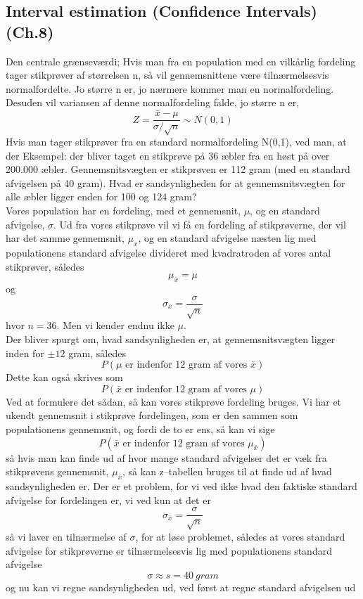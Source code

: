 \documentclass[11pt]{article}
\begin{document}
\subsection{Interval estimation (Confidence Intervals) (Ch.8)}
Den centrale grænseværdi; Hvis man fra en population med en vilkårlig fordeling tager stikprøver af størrelsen n, så vil gennemsnittene være tilnærmelsesvis normalfordelte. Jo større n er, jo nærmere kommer man en normalfordeling. Desuden vil variansen af denne normalfordeling falde, jo større n er,
$$Z=\frac{\bar{x}-\mu }{\sigma/\sqrt{n}}\sim N(0,1)$$
Hvis man tager stikprøver fra en standard normalfordeling N(0,1), ved man, at der
Eksempel: der bliver taget en stikprøve på 36 æbler fra en høst på over 200.000 æbler. Gennemsnitsvægten er stikprøven er 112 gram (med en standard afvigelsen på 40 gram). Hvad er sandsynligheden for at gennemsnitsvægten for alle æbler ligger enden for 100 og 124 gram?\\[0.2cm]
Vores population har en fordeling, med et gennemsnit, $\mu$, og en standard afvigelse, $\sigma$. Ud fra vores stikprøve vil vi få en fordeling af stikprøverne, der vil har det samme gennemsnit, $\mu_x$, og en standard afvigelse næsten lig med populationens standard afvigelse divideret med kvadratroden af vores antal stikprøver, således
$$\mu_{\bar{x}}=\mu$$
og 
$$\sigma_{\bar{x}}= \frac{\sigma}{\sqrt{n}}$$
hvor $n=36$. Men vi kender endnu ikke $\mu$.\\[0.2cm]
Der bliver spurgt om, hvad sandsynligheden er, at gennemsnitsvægten ligger inden for $\pm 12$ gram, således
$$P(\mu\text{ er indenfor 12 gram af vores }\bar{x})$$
Dette kan også skrives som
$$P(\bar{x}\text{ er indenfor 12 gram af vores }\mu)$$
Ved at formulere det sådan, så kan vores stikprøve fordeling bruges. Vi har et ukendt gennemsnit i stikprøve fordelingen, som er den sammen som populationens gennemsnit, og fordi de to er ens, så kan vi sige
$$P(\bar{x}\text{ er indenfor 12 gram af vores }\mu_{\bar{x}})$$
så hvis man kan finde ud af hvor mange standard afvigelser det er væk fra stikprøvens gennemsnit, $\mu_{\bar{x}}$, så kan z--tabellen bruges til at finde ud af hvad sandsynligheden er. Der er et problem, for vi ved ikke hvad den faktiske standard afvigelse for fordelingen er, vi ved kun at det er $$\sigma_{\bar{x}}= \frac{\sigma}{\sqrt{n}}$$
så vi laver en tilnærmelse af $\sigma$, for at løse problemet, således at vores standard afvigelse for stikprøverne er tilnærmelsesvis lig med populationens standard afvigelse
$$\sigma\approx s = 40\:gram$$
og nu kan vi regne sandsynligheden ud, ved først at regne standard afvigelsen ud
\end{document}
